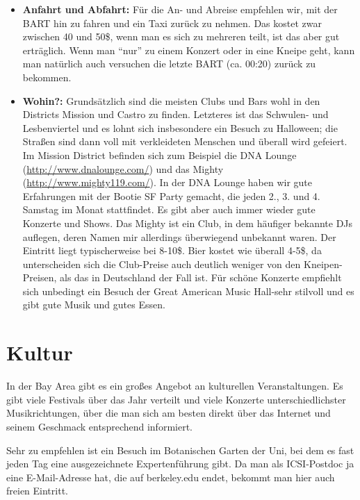 \documentclass[a4paper]{scrreprt}
\begin{document}
\begin{itemize}

	\item \textbf{Anfahrt und Abfahrt:} Für die An- und Abreise empfehlen wir, mit der BART hin zu fahren und ein Taxi zurück zu nehmen. Das kostet zwar zwischen 40 und 50\$, wenn man es sich zu mehreren teilt, ist das aber gut erträglich. Wenn man "`nur"' zu einem Konzert oder in eine Kneipe geht, kann man natürlich auch versuchen die letzte BART (ca. 00:20) zurück zu bekommen.

	\item \textbf{Wohin?:} Grundsätzlich sind die meisten Clubs und Bars wohl in den Districts Mission und Castro zu finden. Letzteres ist das Schwulen- und Lesbenviertel und es lohnt sich insbesondere ein Besuch zu Halloween; die Straßen sind dann voll mit verkleideten Menschen und überall wird gefeiert. Im Mission District befinden sich zum Beispiel die DNA Lounge (\url{http://www.dnalounge.com/}) und das Mighty (\url{http://www.mighty119.com/}). In der DNA Lounge haben wir gute Erfahrungen mit der Bootie SF Party gemacht, die jeden 2., 3. und 4. Samstag im Monat stattfindet. Es gibt aber auch immer wieder gute Konzerte und Shows. Das Mighty ist ein Club, in dem häufiger bekannte DJs auflegen, deren Namen mir allerdings überwiegend unbekannt waren. Der Eintritt liegt typischerweise bei 8-10\$. Bier kostet wie überall 4-5\$, da unterscheiden sich die Club-Preise auch deutlich weniger von den Kneipen-Preisen, als das in Deutschland der Fall ist. Für schöne Konzerte empfiehlt sich unbedingt ein Besuch der Great American Music Hall-sehr stilvoll und es gibt gute Musik und gutes Essen.

\end{itemize}

\section{Kultur}

In der Bay Area gibt es ein großes Angebot an kulturellen Veranstaltungen. Es gibt viele Festivals über das Jahr verteilt und viele Konzerte unterschiedlichster Musikrichtungen, über die man sich am besten direkt über das Internet und seinem Geschmack entsprechend informiert.

Sehr zu empfehlen ist ein Besuch im Botanischen Garten der Uni, bei dem es fast jeden Tag eine ausgezeichnete Expertenführung gibt. Da man als ICSI-Postdoc ja eine E-Mail-Adresse hat, die auf berkeley.edu endet, bekommt man hier auch freien Eintritt.
\end{document}
